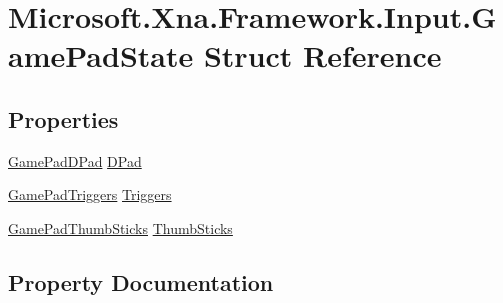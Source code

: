 \hypertarget{struct_microsoft_1_1_xna_1_1_framework_1_1_input_1_1_game_pad_state}{}\section{Microsoft.\+Xna.\+Framework.\+Input.\+Game\+Pad\+State Struct Reference}
\label{struct_microsoft_1_1_xna_1_1_framework_1_1_input_1_1_game_pad_state}
\subsection*{Properties}
\begin{DoxyCompactItemize}
\item 
\hyperlink{struct_microsoft_1_1_xna_1_1_framework_1_1_input_1_1_game_pad_d_pad}{Game\+Pad\+D\+Pad} \hyperlink{struct_microsoft_1_1_xna_1_1_framework_1_1_input_1_1_game_pad_state_a9dbfa749985c74757aeab813b9630310}{D\+Pad}
\item 
\hyperlink{struct_microsoft_1_1_xna_1_1_framework_1_1_input_1_1_game_pad_triggers}{Game\+Pad\+Triggers} \hyperlink{struct_microsoft_1_1_xna_1_1_framework_1_1_input_1_1_game_pad_state_a0ebd50abf029ab6f4c04c172191f13e0}{Triggers}
\item 
\hyperlink{struct_microsoft_1_1_xna_1_1_framework_1_1_input_1_1_game_pad_thumb_sticks}{Game\+Pad\+Thumb\+Sticks} \hyperlink{struct_microsoft_1_1_xna_1_1_framework_1_1_input_1_1_game_pad_state_a8b899b66a912a00091f3fec597be44e0}{Thumb\+Sticks}
\end{DoxyCompactItemize}


\subsection{Property Documentation}
\hypertarget{struct_microsoft_1_1_xna_1_1_framework_1_1_input_1_1_game_pad_state_a9dbfa749985c74757aeab813b9630310}{}
